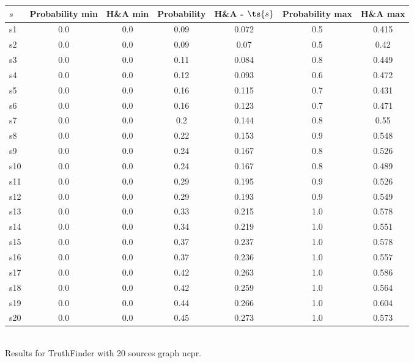 \documentclass{article}
\begin{document}
\noindent\begin{tabular}{|l|c|c|c|c|c|c|}
\hline
$s$& Probability min & H\&A min & Probability & H\&A - $\ts{s}$ & Probability max & H\&A max\\
\hline
s1 &0.0 & 0.0 & 0.09 & 0.072 & 0.5 & 0.415\\
\hline
s2 &0.0 & 0.0 & 0.09 & 0.07 & 0.5 & 0.42\\
\hline
s3 &0.0 & 0.0 & 0.11 & 0.084 & 0.8 & 0.449\\
\hline
s4 &0.0 & 0.0 & 0.12 & 0.093 & 0.6 & 0.472\\
\hline
s5 &0.0 & 0.0 & 0.16 & 0.115 & 0.7 & 0.431\\
\hline
s6 &0.0 & 0.0 & 0.16 & 0.123 & 0.7 & 0.471\\
\hline
s7 &0.0 & 0.0 & 0.2 & 0.144 & 0.8 & 0.55\\
\hline
s8 &0.0 & 0.0 & 0.22 & 0.153 & 0.9 & 0.548\\
\hline
s9 &0.0 & 0.0 & 0.24 & 0.167 & 0.8 & 0.526\\
\hline
s10 &0.0 & 0.0 & 0.24 & 0.167 & 0.8 & 0.489\\
\hline
s11 &0.0 & 0.0 & 0.29 & 0.195 & 0.9 & 0.526\\
\hline
s12 &0.0 & 0.0 & 0.29 & 0.193 & 0.9 & 0.549\\
\hline
s13 &0.0 & 0.0 & 0.33 & 0.215 & 1.0 & 0.578\\
\hline
s14 &0.0 & 0.0 & 0.34 & 0.219 & 1.0 & 0.551\\
\hline
s15 &0.0 & 0.0 & 0.37 & 0.237 & 1.0 & 0.578\\
\hline
s16 &0.0 & 0.0 & 0.37 & 0.236 & 1.0 & 0.557\\
\hline
s17 &0.0 & 0.0 & 0.42 & 0.263 & 1.0 & 0.586\\
\hline
s18 &0.0 & 0.0 & 0.42 & 0.259 & 1.0 & 0.564\\
\hline
s19 &0.0 & 0.0 & 0.44 & 0.266 & 1.0 & 0.604\\
\hline
s20 &0.0 & 0.0 & 0.45 & 0.273 & 1.0 & 0.573\\
\hline
\end{tabular}\\

\noindent Results for TruthFinder with 20 sources graph ncpr.
\end{document}
